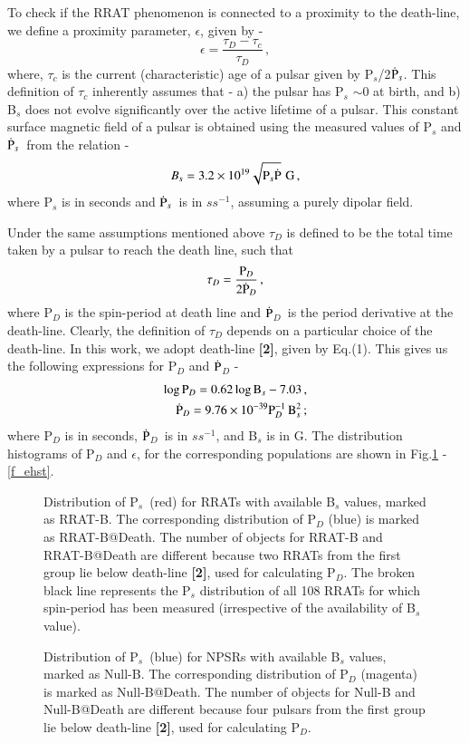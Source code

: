 \documentclass{jaa}
\newcommand{\bef}{\begin{figure}}
\newcommand{\eef}{\end{figure}}
\newcommand{\beq}{\begin{equation}}
\newcommand{\eeq}{\end{equation}}
\newcommand{\ber}{\begin{eqnarray}}
\newcommand{\eer}{\end{eqnarray}}
\newcommand{\pdot}{\mbox{$\dot {\rm P}$}}
\newcommand{\psdot}{\mbox{$\dot{\rm P}_s$}}
\begin{document}
To check  if the RRAT  phenomenon is connected  to a proximity  to the
death-line, we define a proximity parameter, $\epsilon$, given by -
%
\beq 
%
\epsilon = \frac{\tau_D - \tau_c}{\tau_D} \,,
%
\label{eq_eps}
%
\eeq
%
where, $\tau_c$ is the current  (characteristic) age of a pulsar given
by P$_s$/2\psdot. This definition of $\tau_c$ inherently assumes that -
a) the pulsar has P$_s$ $\sim$0 at birth, and b) B$_s$ does not evolve
significantly over  the active  lifetime of  a pulsar.   This constant
surface  magnetic field  of a  pulsar is  obtained using  the measured
values of P$_s$ and \psdot~from the relation -
%
\beq
%
B_s = 3.2 \times 10^{19} \sqrt{{\rm P}_s \dot{\rm P}}\, \, \mbox{G} \,,
%
\eeq
%
where P$_s$ is in seconds and \psdot~is in $ss^{-1}$, assuming a purely
dipolar field.

Under the same  assumptions mentioned above $\tau_D$ is  defined to be
the total time taken by a pulsar to reach the death line, such that
%
\beq
%
\tau_D = \frac{{\rm P}_D}{2 \dot{{\rm P}}_D} \,,
%
\eeq
%
where  P$_D$ is  the spin-period  at death  line and  \pdot$_D$~is the
period  derivative  at  the  death-line. Clearly,  the  definition  of
$\tau_D$ depends  on a particular  choice of the death-line.   In this
work, we  adopt death-line {\bf [2]},  given by Eq.(1). This  gives us
the following expressions for P$_D$ and \pdot$_D$ -
%
\ber
%
\log {\rm P}_D = 0.62 \log {\rm B}_s - 7.03 \,, \\
%
\dot{\rm P}_D = 9.76 \times 10^{-39} {\rm P}_D^{-1} \, {\rm B}^2_s \,;
%
\eer
%
where P$_D$ is in seconds, \pdot$_D$~is  in $ss^{-1}$, and B$_s$ is in
G.  The  distribution histograms  of  P$_D$  and $\epsilon$,  for  the
corresponding   populations  are   shown   in  Fig.\ref{f_PDhst-R}   -
\ref{f_ehst}.

%
\bef
%
%
\caption{Distribution of P$_s$~(red) for RRATs with available B$_s$ values, marked as RRAT-B. The corresponding distribution of P$_D$ (blue) is marked as RRAT-B@Death. The number of objects for RRAT-B and RRAT-B@Death are different because two RRATs from the first group lie below death-line {\bf [2]}, used for calculating P$_D$. The broken black line represents the P$_s$ distribution of all 108 RRATs for which spin-period has been measured (irrespective of the availability of B$_s$ value). }
%
\label{f_PDhst-R} 
%
\eef
%

%
\bef
%
%
\caption{Distribution of P$_s$~(blue) for NPSRs with available B$_s$ values, marked as Null-B. The corresponding distribution of P$_D$ (magenta) is marked as Null-B@Death. The number of objects for Null-B and Null-B@Death are different because four pulsars from the first group lie below death-line {\bf [2]}, used for calculating P$_D$.}
%
\label{f_PDhst-N} 
%
\eef
%
\end{document}
